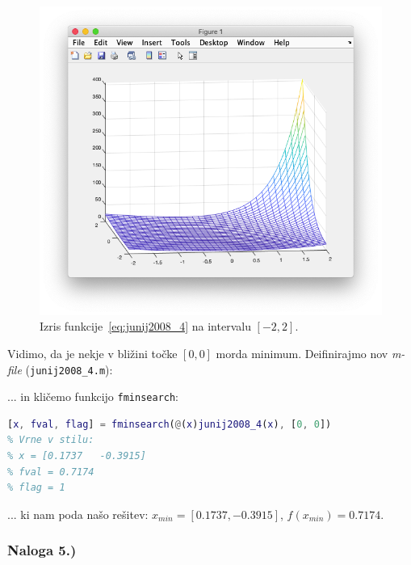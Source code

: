 \documentclass[a4paper,11pt]{article}
\begin{document}
\begin{figure}[hbt]
	\centering
	\includegraphics[scale=.4]{images/junij2008_4_plot.png}
	\caption{Izris funkcije~\ref{eq:junij2008_4} na intervalu $[-2, 2]$.}
	\label{img:junij2008_4_plot}
\end{figure}
Vidimo, da je nekje v bližini točke $[0, 0]$ morda minimum. Deifinirajmo nov \textit{m-file} (\texttt{junij2008\_4.m}):

... in kličemo funkcijo \texttt{fminsearch}:

\begin{lstlisting}[language=Matlab]
[x, fval, flag] = fminsearch(@(x)junij2008_4(x), [0, 0])
% Vrne v stilu:
% x = [0.1737   -0.3915]
% fval = 0.7174
% flag = 1
\end{lstlisting}
... ki nam poda našo rešitev: $x_{min} =  [0.1737, -0.3915]$, $f(x_{min}) = 0.7174$.

\subsubsection{Naloga 5.)}
\label{task:junij2008_5}
\end{document}
